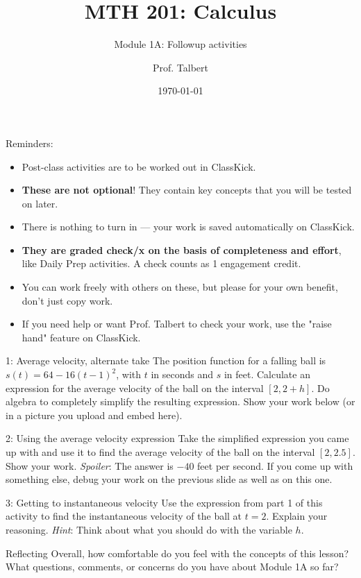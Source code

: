 \documentclass{beamer}
\title{MTH 201: Calculus}
\subtitle{Module 1A: Followup activities}
\author{Prof. Talbert}
\institute{GVSU}
\date{\today}
\begin{document}
\frame{\titlepage}

\begin{frame}{Reminders:}

\begin{itemize}
    \item Post-class activities are to be worked out in ClassKick.
    \item \textbf{These are not optional}! They contain key concepts that you will be tested on later. 
    \item There is nothing to turn in --- your work is saved automatically on ClassKick. 
    \item \textbf{They are graded check/x on the basis of completeness and effort}, like Daily Prep activities. A check counts as 1 engagement credit. 
    \item You can work freely with others on these, but please for your own benefit, don't just copy work. 
    \item If you need help or want Prof. Talbert to check your work, use the "raise hand" feature on ClassKick. 
\end{itemize}

\end{frame}


\begin{frame}[t]{1: Average velocity, alternate take}
The position function for a falling ball is $s(t)=64-16(t-1)^2$, with $t$ in seconds and $s$ in feet. Calculate an expression for the average velocity of the ball on the interval $[2,2+h]$. Do algebra to completely simplify the resulting expression. Show your work below (or in a picture you upload and embed here). 
    
\end{frame}

\begin{frame}[t]{2: Using the average velocity expression}
Take the simplified expression you came up with and use it to find the average velocity of the ball on the interval $[2, 2.5]$. Show your work. \textit{Spoiler}: The answer is $-40$ feet per second. If you come up with something else, debug your work on the previous slide as well as on this one. 

\end{frame}

\begin{frame}[t]{3: Getting to instantaneous velocity}
    Use the expression from part 1 of this activity to find the instantaneous velocity of the ball at $t=2$. Explain your reasoning. \textit{Hint}: Think about what you should do with the variable $h$. 
\end{frame}

\begin{frame}[t]{Reflecting}
Overall, how comfortable do you feel with the concepts of this lesson? What questions, comments, or concerns do you have about Module 1A so far?     
    
    
\end{frame}
\end{document}
